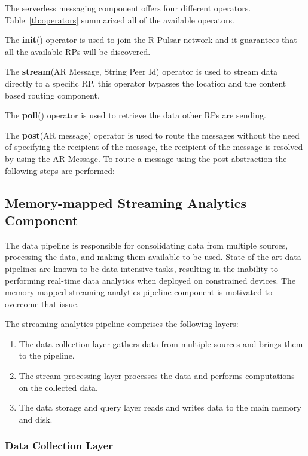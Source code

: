 The serverless messaging component offers four different operators. Table~\ref{tb:operators} summarized all of the available operators.

The \textbf{init}() operator is used to join the R-Pulsar network and it guarantees that all the available RPs will be discovered.

The \textbf{stream}(AR Message, String Peer Id) operator is used to stream data directly to a specific RP, this operator bypasses the location and the content based routing component.

The \textbf{poll}() operator is used to retrieve the data other RPs are sending.

The \textbf{post}(AR message) operator is used to route the messages without the need of specifying the recipient of the message, the recipient of the message is resolved by using the AR Message. To route a message using the post abstraction the following steps are performed:

\subsection{Memory-mapped Streaming Analytics Component}
The data pipeline is responsible for consolidating data from multiple sources, processing the data, and making them available to be used. State-of-the-art data pipelines are known to be data-intensive tasks, resulting in the inability to performing real-time data analytics when deployed on constrained devices. The memory-mapped streaming analytics pipeline component is motivated to overcome that issue.

The streaming analytics pipeline comprises the following layers: 

\begin{enumerate}

\item The data collection layer gathers data from multiple sources and brings them to the pipeline.
\item The stream processing layer processes the data and performs computations on the collected data.   
\item The data storage and query layer reads and writes data to the main memory and disk.

\end{enumerate}

\subsubsection{Data Collection Layer}

